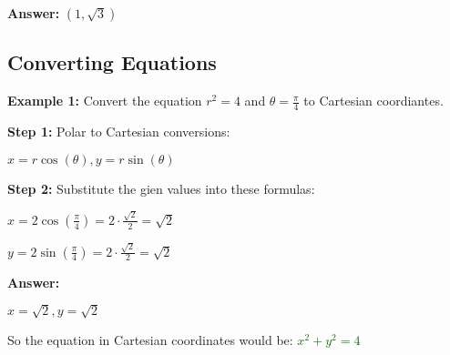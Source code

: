 \documentclass[10pt]{article}                               %
\begin{document}
\begin{defaultbox}
\begin{adjustwidth}{2em}{0pt}
\begin{adjustwidth}{2em}{0pt}
\begin{examplebox}
\begin{adjustwidth}{2em}{0pt}
                    \textbf{Answer:} \( \left(1,\sqrt{3}\right) \)

                \end{adjustwidth}

            \end{examplebox}

            \begin{examplebox}
            
                \subsection*{Converting Equations}

                \textbf{Example 1:} Convert the equation \( r^2 = 4 \) and \( \theta = \frac{\pi}{4} \) to Cartesian coordiantes.
                \vspace{0.5em}

                \begin{adjustwidth}{2em}{0pt}

                    \textbf{Step 1:} Polar to Cartesian conversions:

                    \vspace{0.25em}

                    \( x = r\cos(\theta), y = r\sin(\theta) \)

                    \vspace{0.5em}

                    \textbf{Step 2:} Substitute the gien values into these formulas:

                    \vspace{0.25em}

                    \( x = 2\cos\left(\frac{\pi}{4}\right) = 2 \cdot \frac{\sqrt{2}}{2} = \sqrt{2} \)

                    \( y = 2\sin\left(\frac{\pi}{4}\right) = 2 \cdot \frac{\sqrt{2}}{2} = \sqrt{2} \)

                    \vspace{0.5em}

                    \textbf{Answer:}

                    \vspace{0.25em}

                    \( x = \sqrt{2}, y = \sqrt{2} \)

                    \vspace{0.5em}

                    So the equation in Cartesian coordinates would be:
                    \textcolor{darkgreen}{\( x^2 + y^2 = 4 \)}


\end{adjustwidth}
\end{examplebox}
\end{adjustwidth}
\end{adjustwidth}
\end{defaultbox}
\end{document}
